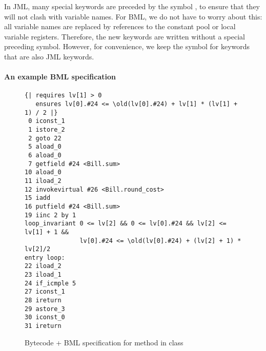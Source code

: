 

In JML, many special keywords are preceded by the symbol
\jmlKey{\bsl}, to ensure that they will not clash with variable
names. For BML, we do not have to worry about this: all
variable names are replaced by references to the constant pool or
local variable registers. Therefore, the new keywords are written
without a special preceding symbol. However, for convenience, we keep
the symbol for keywords that are also JML keywords.



\paragraph{An example BML specification}
\label{sec:bml:example}


\begin{figure}[t]
{\small
\begin{verbatim}
{| requires lv[1] > 0 
   ensures lv[0].#24 <= \old(lv[0].#24) + lv[1] * (lv[1] + 1) / 2 |}
 0 iconst_1
 1 istore_2
 2 goto 22 
 5 aload_0
 6 aload_0
 7 getfield #24 <Bill.sum>
10 aload_0
11 iload_2
12 invokevirtual #26 <Bill.round_cost>
15 iadd
16 putfield #24 <Bill.sum>
19 iinc 2 by 1
loop_invariant 0 <= lv[2] && 0 <= lv[0].#24 && lv[2] <= lv[1] + 1 && 
               lv[0].#24 <= \old(lv[0].#24) + (lv[2] + 1) * lv[2]/2
entry loop:
22 iload_2
23 iload_1
24 if_icmple 5 
27 iconst_1
28 ireturn
29 astore_3
30 iconst_0
31 ireturn
\end{verbatim}
}
\caption{Bytecode + BML specification for method  in class }\label{FigBMLSpec}
\end{figure}

